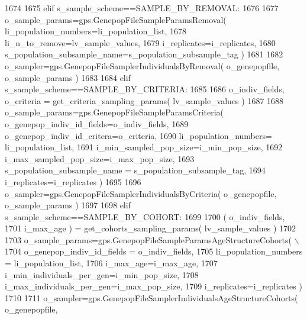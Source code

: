 \begin{DoxyCode}
1674 
1675     \textcolor{keywordflow}{elif} s\_sample\_scheme==SAMPLE\_BY\_REMOVAL:
1676 
1677         o\_sample\_params=gps.GenepopFileSampleParamsRemoval( li\_population\_numbers=li\_population\_list,
1678                                                 li\_n\_to\_remove=lv\_sample\_values,
1679                                                 i\_replicates=i\_replicates,
1680                                                 s\_population\_subsample\_name=s\_population\_subsample\_tag )
1681 
1682         o\_sampler=gps.GenepopFileSamplerIndividualsByRemoval( o\_genepopfile, o\_sample\_params )
1683 
1684     \textcolor{keywordflow}{elif} s\_sample\_scheme==SAMPLE\_BY\_CRITERIA:
1685 
1686         o\_indiv\_fields, o\_criteria = get\_criteria\_sampling\_params( lv\_sample\_values )
1687 
1688         o\_sample\_params=gps.GenepopFileSampleParamsCriteria( o\_genepop\_indiv\_id\_fields=o\_indiv\_fields,
1689                                                                     o\_genepop\_indiv\_id\_critera=o\_criteria,
1690                                                                     li\_population\_numbers=
      li\_population\_list,
1691                                                                     i\_min\_sampled\_pop\_size=i\_min\_pop\_size,
1692                                                                     i\_max\_sampled\_pop\_size=i\_max\_pop\_size,
1693                                                                     s\_population\_subsample\_name = 
      s\_population\_subsample\_tag,
1694                                                                     i\_replicates=i\_replicates )
1695 
1696         o\_sampler=gps.GenepopFileSamplerIndividualsByCriteria( o\_genepopfile, o\_sample\_params )
1697 
1698     \textcolor{keywordflow}{elif} s\_sample\_scheme==SAMPLE\_BY\_COHORT:
1699 
1700         ( o\_indiv\_fields,
1701             i\_max\_age ) = get\_cohorts\_sampling\_params( lv\_sample\_values )
1702 
1703         o\_sample\_params=gps.GenepopFileSampleParamsAgeStructureCohorts( \(\backslash\)
1704                                         o\_genepop\_indiv\_id\_fields = o\_indiv\_fields,
1705                                         li\_population\_numbers = li\_population\_list,
1706                                         i\_max\_age=i\_max\_age,
1707                                         i\_min\_individuals\_per\_gen=i\_min\_pop\_size,
1708                                         i\_max\_individuals\_per\_gen=i\_max\_pop\_size,
1709                                         i\_replicates=i\_replicates )
1710 
1711         o\_sampler=gps.GenepopFileSamplerIndividualsAgeStructureCohorts( o\_genepopfile,

\end{DoxyCode}

